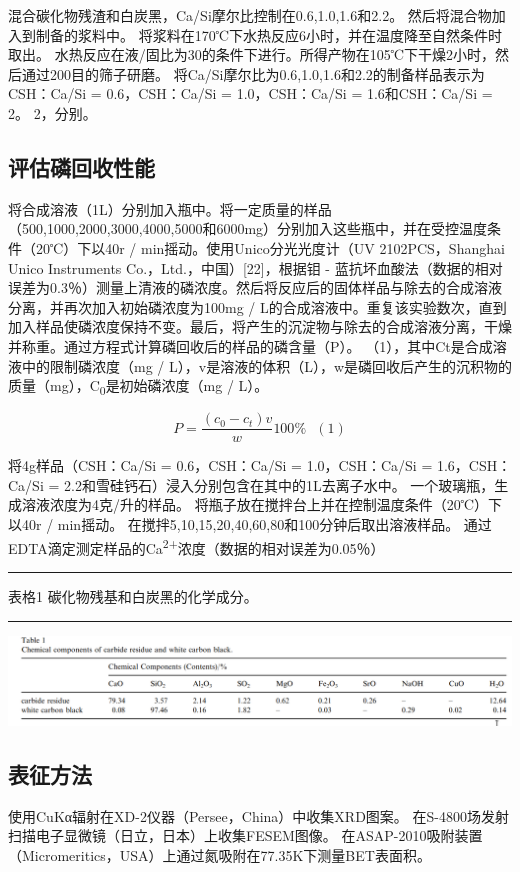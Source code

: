 \documentclass[11pt]{article}
\begin{document}
混合碳化物残渣和白炭黑，Ca/Si摩尔比控制在0.6,1.0,1.6和2.2。 然后将混合物加入到制备的浆料中。 将浆料在170℃下水热反应6小时，并在温度降至自然条件时取出。 水热反应在液/固比为30的条件下进行。所得产物在105℃下干燥2小时，然后通过200目的筛子研磨。 将Ca/Si摩尔比为0.6,1.0,1.6和2.2的制备样品表示为CSH：Ca/Si = 0.6，CSH：Ca/Si = 1.0，CSH：Ca/Si = 1.6和CSH：Ca/Si = 2。 2，分别。
\subsection{评估磷回收性能}
\label{sec:org4ae9519}
将合成溶液（1L）分别加入瓶中。将一定质量的样品（500,1000,2000,3000,4000,5000和6000mg）分别加入这些瓶中，并在受控温度条件（20℃）下以40r / min摇动。使用Unico分光光度计（UV 2102PCS，Shanghai Unico Instruments Co.，Ltd.，中国）[22]，根据钼 - 蓝抗坏血酸法（数据的相对误差为0.3％）测量上清液的磷浓度。然后将反应后的固体样品与除去的合成溶液分离，并再次加入初始磷浓度为100mg / L的合成溶液中。重复该实验数次，直到加入样品使磷浓度保持不变。最后，将产生的沉淀物与除去的合成溶液分离，干燥并称重。通过方程式计算磷回收后的样品的磷含量（P）。 （1），其中Ct是合成溶液中的限制磷浓度（mg / L），v是溶液的体积（L），w是磷回收后产生的沉积物的质量（mg），C\textsubscript{0}是初始磷浓度（mg / L）。

\[P = \frac{(c_{0} - c_{t})v}{w} 100\% \ \ \  (1)\]

将4g样品（CSH：Ca/Si = 0.6，CSH：Ca/Si = 1.0，CSH：Ca/Si = 1.6，CSH：Ca/Si = 2.2和雪硅钙石）浸入分别包含在其中的1L去离子水中。 一个玻璃瓶，生成溶液浓度为4克/升的样品。 将瓶子放在搅拌台上并在控制温度条件（20℃）下以40r / min摇动。 在搅拌5,10,15,20,40,60,80和100分钟后取出溶液样品。 通过EDTA滴定测定样品的Ca\textsuperscript{2+}浓度（数据的相对误差为0.05％）\cite{kim03_effec_ph_sulfat_sodium_edta_titrat_calcium}

\noindent\rule{\textwidth}{0.5pt}
表格1
碳化物残基和白炭黑的化学成分。

\noindent\rule{\textwidth}{0.5pt}

\includegraphics[scale=0.3]{table1.png}

\subsection{表征方法}
\label{sec:org3009fa0}
使用CuKα辐射在XD-2仪器（Persee，China）中收集XRD图案。 在S-4800场发射扫描电子显微镜（日立，日本）上收集FESEM图像。 在ASAP-2010吸附装置（Micromeritics，USA）上通过氮吸附在77.35K下测量BET表面积。
\end{document}
